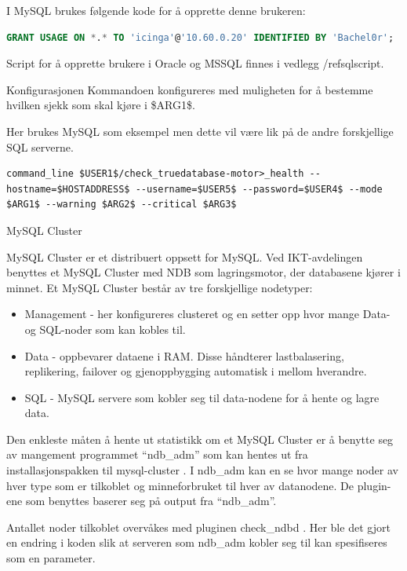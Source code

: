 I MySQL brukes følgende kode for å opprette denne brukeren:
\begin{lstlisting}[language=SQL]
GRANT USAGE ON *.* TO 'icinga'@'10.60.0.20' IDENTIFIED BY 'Bachel0r'; 
\end{lstlisting}

Script for å opprette brukere i Oracle og MSSQL finnes i vedlegg /ref{sqlscript}.

Konfigurasjonen
Kommandoen konfigureres med muligheten for å bestemme hvilken sjekk som skal kjøre i \$ARG1\$.

Her brukes MySQL som eksempel men dette vil være lik på de andre forskjellige SQL serverne. 
\begin{lstlisting}
command_line $USER1$/check_truedatabase-motor>_health --hostname=$HOSTADDRESS$ --username=$USER5$ --password=$USER4$ --mode $ARG1$ --warning $ARG2$ --critical $ARG3$
\end{lstlisting}
MySQL Cluster

MySQL Cluster er et distribuert oppsett for MySQL. Ved IKT-avdelingen benyttes et MySQL Cluster med NDB som lagringsmotor, der databasene kjører i minnet. Et MySQL Cluster består av tre forskjellige nodetyper:

\begin{itemize}
	\item Management - her konfigureres clusteret og en setter opp hvor mange Data- og SQL-noder som kan kobles til.
	\item Data - oppbevarer dataene i RAM. Disse håndterer lastbalasering, replikering, failover og gjenoppbygging automatisk i mellom hverandre.
	\item SQL - MySQL servere som kobler seg til data-nodene for å hente og lagre data.
\end{itemize}

Den enkleste måten å hente ut statistikk om et MySQL Cluster er å benytte seg av mangement programmet “ndb\_adm” som kan hentes ut fra installasjonspakken til mysql-cluster . I ndb\_adm kan en se hvor mange noder av hver type som er tilkoblet og minneforbruket til hver av datanodene. De plugin-ene som benyttes baserer seg på output fra “ndb\_adm”.

Antallet noder tilkoblet overvåkes med pluginen check\_ndbd . Her ble det gjort en endring i koden slik at serveren som ndb\_adm kobler seg til kan spesifiseres som en parameter.

